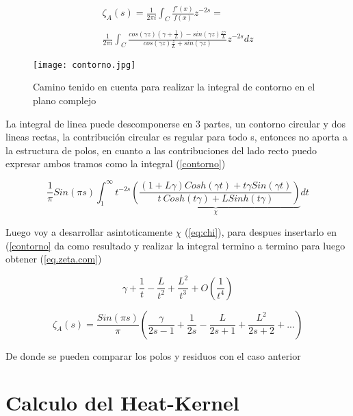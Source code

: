 \begin{equation}
\begin{array}{c}
   \zeta _A (s) =  \frac{1}{2 \pi i} \int _{C} \frac{f'(x)}{f(x)} z ^{-2s} = \\ 
   \\ 
    \frac{1}{2 \pi i} \int _{C}
    \frac{ cos(\gamma z) \left(\gamma + \frac{1}{L} \right) - sin(\gamma z) \frac{z \gamma}{L}
    }
    {cos(\gamma z) \frac{z}{L} + sin(\gamma z)
    }
    z ^{-2 s} dz
\end{array}
\end{equation}




\begin{figure}
\centering
\texttt{[image: contorno.jpg]}
\caption{Camino tenido en cuenta para realizar la integral de contorno en el plano complejo}
\label{fig:contorno}
\end{figure}


La integral de linea puede descomponerse en 3 partes, un contorno circular y dos lineas rectas, la contribución circular es regular para todo s, entonces no aporta a la estructura de polos, en cuanto a las contribuciones del lado recto puedo expresar ambos tramos como la integral (\ref{contorno}) 

\begin{equation}
    \frac{1}{ \pi } 
    Sin(\pi s)
    \int _1 ^{\infty} 
    t ^{-2s}
    \underbrace{
    \left( 
    \frac{(1+L \gamma) Cosh( \gamma t)+ t \gamma Sin(\gamma t)}
    {t \ Cosh(t \gamma)+ L Sinh(t \gamma)}
    \right)} _{\chi}
    dt 
\label{contorno}
\end{equation}

Luego voy a desarrollar asintoticamente  $\chi$  (\ref{eq:chi}), para despues insertarlo en (\ref{contorno} da como resultado y realizar la integral termino a termino para luego obtener (\ref{eq.zeta.com})

\begin{equation}
    \gamma + \frac{1}{t}-\frac{L}{t^2}+\frac{L^2}{t^3}+O(\frac{1}{t^4})
\label{eq:chi}
\end{equation}

\begin{equation}
    \zeta _A (s) = 
    \frac{Sin(\pi s)}{\pi}
    \left(
    \frac{\gamma}{2s-1} + 
    \frac{1}{2s} -
    \frac{L}{2s+1} +
    \frac{L^2}{2s+2} + ...
    \right)
\label{eq.zeta.com}
\end{equation}

De donde se pueden comparar los polos y residuos con el caso anterior 

\section{Calculo del Heat-Kernel}
